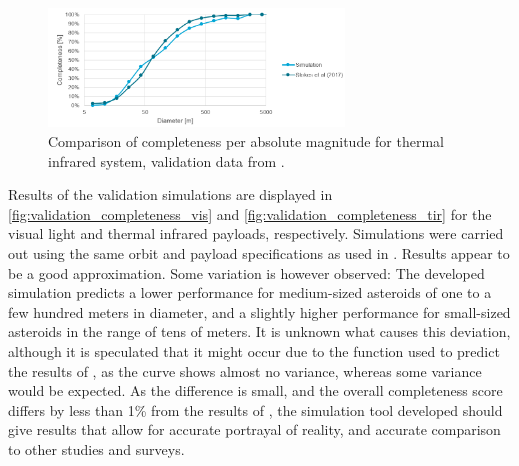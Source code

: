 \begin{figure}[htbp]
 \centering
 \includegraphics[width=0.7\textwidth]{img/validation_completeness_tir.png}
 \caption{Comparison of completeness per absolute magnitude for thermal infrared system, validation data from \cite{2017NEOSDT}.}
 \label{fig:validation_completeness_tir}
\end{figure}

Results of the validation simulations are displayed in \autoref{fig:validation_completeness_vis} and \autoref{fig:validation_completeness_tir} for the visual light and thermal infrared payloads, respectively. Simulations were carried out using the same orbit and payload specifications as used in \cite{2017NEOSDT}. Results appear to be a good approximation. Some variation is however observed: The developed simulation predicts a lower performance for medium-sized asteroids of one to a few hundred meters in diameter, and a slightly higher performance for small-sized asteroids in the range of tens of meters. It is unknown what causes this deviation, although it is speculated that it might occur due to the function used to predict the results of \cite{2017NEOSDT}, as the curve shows almost no variance, whereas some variance would be expected. As the difference is small, and the overall completeness score differs by less than 1\% from the results of \cite{2017NEOSDT}, the simulation tool developed should give results that allow for accurate portrayal of reality, and accurate comparison to other studies and surveys.
